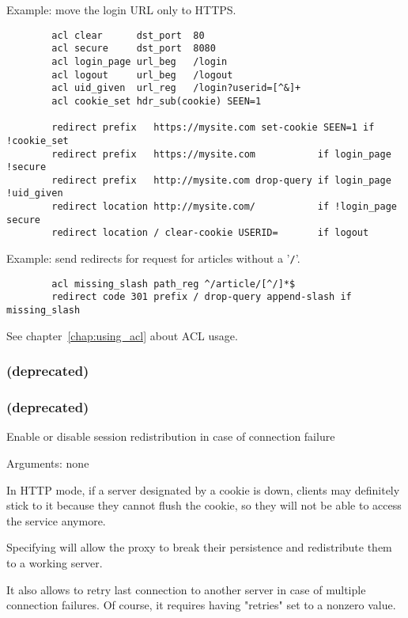 {  Example: move the login URL only to HTTPS.
  \begin{verbatim}
        acl clear      dst_port  80
        acl secure     dst_port  8080
        acl login_page url_beg   /login
        acl logout     url_beg   /logout
        acl uid_given  url_reg   /login?userid=[^&]+
        acl cookie_set hdr_sub(cookie) SEEN=1

        redirect prefix   https://mysite.com set-cookie SEEN=1 if !cookie_set
        redirect prefix   https://mysite.com           if login_page !secure
        redirect prefix   http://mysite.com drop-query if login_page !uid_given
        redirect location http://mysite.com/           if !login_page secure
        redirect location / clear-cookie USERID=       if logout
  \end{verbatim}

  Example: send redirects for request for articles without a '\verb|/|'.
  \begin{verbatim}
        acl missing_slash path_reg ^/article/[^/]*$
        redirect code 301 prefix / drop-query append-slash if missing_slash
  \end{verbatim}
  See chapter~\ref{chap:using_acl} about ACL usage.

\subsubsection[redisp]{ (deprecated)}
\subsubsection[redispatch]{ (deprecated)}

  Enable or disable session redistribution in case of connection failure


  Arguments: none

  In HTTP mode, if a server designated by a cookie is down, clients may
  definitely stick to it because they cannot flush the cookie, so they will not
  be able to access the service anymore.

  Specifying  will allow the proxy to break their persistence and
  redistribute them to a working server.

  It also allows to retry last connection to another server in case of multiple
  connection failures. Of course, it requires having "retries" set to a nonzero
  value.

}
